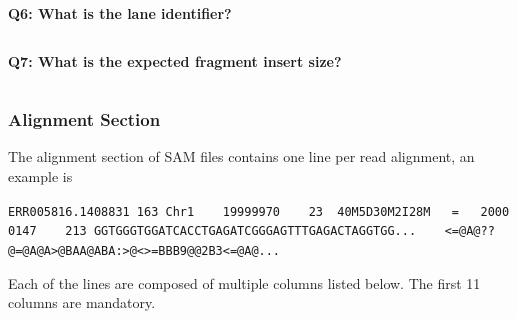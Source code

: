 \documentclass[11pt]{article}
\makeatletter
\newcommand{\boxspacing}{\kern\kvtcb@left@rule\kern\kvtcb@boxsep}
\newcommand{\prompt}[4]{
        {\ttfamily\llap{{\color{blue}\LARGE\faKeyboardO\hspace{3pt}#4}}\vspace{-\baselineskip}}
    }
\makeatother
\begin{document}
    \textbf{Q6: What is the lane identifier?}

    \begin{tcolorbox}[breakable, size=fbox, boxrule=1pt, pad at break*=1mm,colback=cellbackground, colframe=cellborder]
\prompt{In}{incolor}{ }{\boxspacing}
\begin{Verbatim}[commandchars=\\\{\}]

\end{Verbatim}
\end{tcolorbox}

    \textbf{Q7: What is the expected fragment insert size?}

    \begin{tcolorbox}[breakable, size=fbox, boxrule=1pt, pad at break*=1mm,colback=cellbackground, colframe=cellborder]
\prompt{In}{incolor}{ }{\boxspacing}
\begin{Verbatim}[commandchars=\\\{\}]

\end{Verbatim}
\end{tcolorbox}

    \hypertarget{alignment-section}{%
\subsubsection{Alignment Section}\label{alignment-section}}

The alignment section of SAM files contains one line per read alignment,
an example is

\texttt{ERR005816.1408831\ 163\ Chr1\ \ \ \ 19999970\ \ \ \ 23\ \ 40M5D30M2I28M\ \ \ =\ \ \ 20000147\ \ \ \ 213\ GGTGGGTGGATCACCTGAGATCGGGAGTTTGAGACTAGGTGG...\ \ \ \ \textless{}=@A@??@=@A@A\textgreater{}@BAA@ABA:\textgreater{}@\textless{}\textgreater{}=BBB9@@2B3\textless{}=@A@...}

Each of the lines are composed of multiple columns listed below. The
first 11 columns are mandatory.
\end{document}
